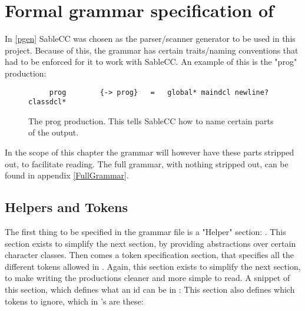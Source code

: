 \section {Formal grammar specification of \lang{}}
In \ref{pgen} SableCC was chosen as the parser/scanner generator to be used in this project. Because of this, the grammar has certain traits/naming conventions that had to be enforced for it to work with SableCC. An example of this is the "prog" production:

\begin{figure}[H]
  \centering
    \begin{lstlisting}
     prog        {-> prog}   =   global* maindcl newline? classdcl*
    \end{lstlisting}
  \caption{The prog production. This tells SableCC how to name certain parts of the output.}
  \label{fig:prog}
\end{figure}

In the scope of this chapter the grammar will however have these parts stripped out, to facilitate reading. The full grammar, with nothing stripped out, can be found in appendix \ref{FullGrammar}. 

\subsection{Helpers and Tokens}
The first thing to be specified in the grammar file is a "Helper" section:
. 
This section exists to simplify the next section, by providing abstractions over certain character classes.
Then comes a token specification section, that specifies all the different tokens allowed in \lang{}. Again, this section exists to simplify the next section, to make writing the productions cleaner and more simple to read. A snippet of this section, which defines what an id can be in \lang{}: 
This section also defines which tokens to ignore, which in \lang{}'s are these:

